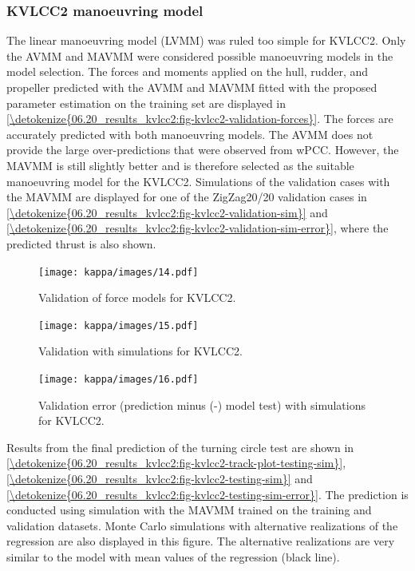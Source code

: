 \subsubsection{KVLCC2 manoeuvring model}
\label{\detokenize{06.20_results_kvlcc2:kvlcc2-manoeuvring-model}}
The linear manoeuvring model (LVMM) was ruled too simple for KVLCC2. Only the AVMM and MAVMM were considered possible manoeuvring models in the model selection.
The forces and moments applied on the hull, rudder, and propeller predicted with the AVMM and MAVMM fitted with the proposed parameter estimation on the training set are displayed in \hyperref[\detokenize{06.20_results_kvlcc2:fig-kvlcc2-validation-forces}]{\autoref{\detokenize{06.20_results_kvlcc2:fig-kvlcc2-validation-forces}}}.
The forces are accurately predicted with both manoeuvring models. The AVMM does not provide the large over-predictions that were observed from wPCC. However, the MAVMM is still slightly better and is therefore selected as the suitable manoeuvring model for the KVLCC2.
Simulations of the validation cases with the MAVMM are displayed for one of the ZigZag20/20 validation cases in \hyperref[\detokenize{06.20_results_kvlcc2:fig-kvlcc2-validation-sim}]{\autoref{\detokenize{06.20_results_kvlcc2:fig-kvlcc2-validation-sim}}} and \hyperref[\detokenize{06.20_results_kvlcc2:fig-kvlcc2-validation-sim-error}]{\autoref{\detokenize{06.20_results_kvlcc2:fig-kvlcc2-validation-sim-error}}}, where the predicted thrust is also shown.
\begin{figure}[h]
\centering
\texttt{[image: kappa/images/14.pdf]}
\caption{Validation of force models for KVLCC2.}\label{\detokenize{06.20_results_kvlcc2:fig-kvlcc2-validation-forces}}\end{figure}
\begin{figure}[h]
\centering
\texttt{[image: kappa/images/15.pdf]}
\caption{Validation with simulations for KVLCC2.}\label{\detokenize{06.20_results_kvlcc2:fig-kvlcc2-validation-sim}}\end{figure}
\begin{figure}[h]
\centering
\texttt{[image: kappa/images/16.pdf]}
\caption{Validation error (prediction minus (-) model test) with simulations for KVLCC2.}\label{\detokenize{06.20_results_kvlcc2:fig-kvlcc2-validation-sim-error}}\end{figure}
\clearpage
\noindent Results from the final prediction of the turning circle test are shown in  \hyperref[\detokenize{06.20_results_kvlcc2:fig-kvlcc2-track-plot-testing-sim}]{\autoref{\detokenize{06.20_results_kvlcc2:fig-kvlcc2-track-plot-testing-sim}}}, \hyperref[\detokenize{06.20_results_kvlcc2:fig-kvlcc2-testing-sim}]{\autoref{\detokenize{06.20_results_kvlcc2:fig-kvlcc2-testing-sim}}} and \hyperref[\detokenize{06.20_results_kvlcc2:fig-kvlcc2-testing-sim-error}]{\autoref{\detokenize{06.20_results_kvlcc2:fig-kvlcc2-testing-sim-error}}}. The prediction is conducted using simulation with the MAVMM trained on the training and validation datasets. Monte Carlo simulations with alternative realizations of the regression are also displayed in this figure. The alternative realizations are very similar to the model with mean values of the regression (black line).
